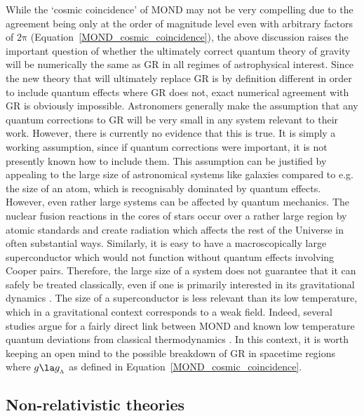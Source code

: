 \documentclass[fleqn,usenatbib,useAMS]{mnras} %
\begin{document}
While the `cosmic coincidence' of MOND may not be very compelling due to the agreement being only at the order of magnitude level even with arbitrary factors of $2\mathrm{\pi}$ (Equation~\ref{MOND_cosmic_coincidence}), the above discussion raises the important question of whether the ultimately correct quantum theory of gravity will be numerically the same as GR in all regimes of astrophysical interest. Since the new theory that will ultimately replace GR is by definition different in order to include quantum effects where GR does not, exact numerical agreement with GR is obviously impossible. Astronomers generally make the assumption that any quantum corrections to GR will be very small in any system relevant to their work. However, there is currently no evidence that this is true. It is simply a working assumption, since if quantum corrections were important, it is not presently known how to include them. This assumption can be justified by appealing to the large size of astronomical systems like galaxies compared to e.g. the size of an atom, which is recognisably dominated by quantum effects. However, even rather large systems can be affected by quantum mechanics. The nuclear fusion reactions in the cores of stars occur over a rather large region by atomic standards and create radiation which affects the rest of the Universe in often substantial ways. Similarly, it is easy to have a macroscopically large superconductor which would not function without quantum effects involving Cooper pairs. Therefore, the large size of a system does not guarantee that it can safely be treated classically, even if one is primarily interested in its gravitational dynamics \citep{Cadoni_2019, Giusti_2022}. The size of a superconductor is less relevant than its low temperature, which in a gravitational context corresponds to a weak field. Indeed, several studies argue for a fairly direct link between MOND and known low temperature quantum deviations from classical thermodynamics \citep*{Pazy_2013, Bagchi_2019, Senay_2021}. In this context, it is worth keeping an open mind to the possible breakdown of GR in spacetime regions where $g \la g_{_\Lambda}$ as defined in Equation~\ref{MOND_cosmic_coincidence}.



\subsection{Non-relativistic theories}
\label{Non_relativistic_MOND}
\end{document}
